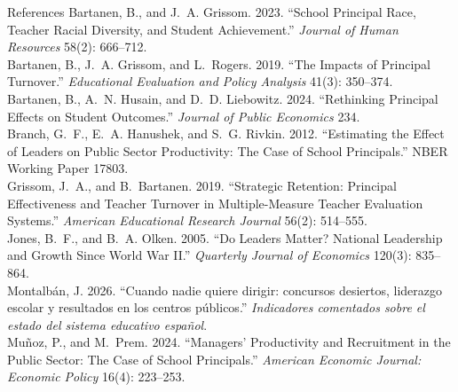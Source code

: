 \documentclass[aspectratio=169,11pt]{beamer}
\begin{document}
\begin{frame}[allowframebreaks]{References}
\footnotesize
Bartanen, B., and J.~A. Grissom. 2023. ``School Principal Race, Teacher Racial Diversity, and Student Achievement.'' \textit{Journal of Human Resources} 58(2): 666--712.\\[0.35em]
Bartanen, B., J.~A. Grissom, and L.~Rogers. 2019. ``The Impacts of Principal Turnover.'' \textit{Educational Evaluation and Policy Analysis} 41(3): 350--374.\\[0.35em]
Bartanen, B., A.~N. Husain, and D.~D. Liebowitz. 2024. ``Rethinking Principal Effects on Student Outcomes.'' \textit{Journal of Public Economics} 234.\\[0.35em]
Branch, G.~F., E.~A. Hanushek, and S.~G. Rivkin. 2012. ``Estimating the Effect of Leaders on Public Sector Productivity: The Case of School Principals.'' NBER Working Paper 17803.\\[0.35em]
Grissom, J.~A., and B.~Bartanen. 2019. ``Strategic Retention: Principal Effectiveness and Teacher Turnover in Multiple-Measure Teacher Evaluation Systems.'' \textit{American Educational Research Journal} 56(2): 514--555.\\[0.35em]
Jones, B.~F., and B.~A. Olken. 2005. ``Do Leaders Matter? National Leadership and Growth Since World War II.'' \textit{Quarterly Journal of Economics} 120(3): 835--864.\\[0.35em]
Montalb\'an, J. 2026. ``Cuando nadie quiere dirigir: concursos desiertos, liderazgo escolar y resultados en los centros p\'ublicos.'' \textit{Indicadores comentados sobre el estado del sistema educativo espa\~nol}.\\[0.35em]
Mu\~noz, P., and M.~Prem. 2024. ``Managers' Productivity and Recruitment in the Public Sector: The Case of School Principals.'' \textit{American Economic Journal: Economic Policy} 16(4): 223--253.
\end{frame}
\end{document}
